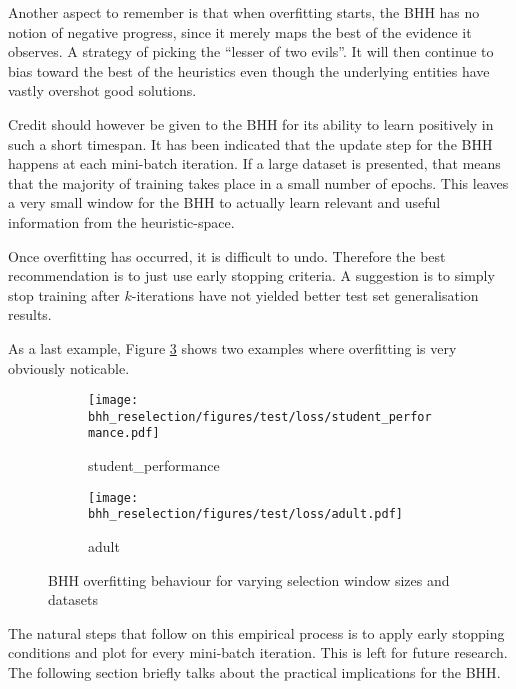 Another aspect to remember is that when overfitting starts, the \Ac{BHH} has no notion of negative progress, since it merely maps the best of the evidence it observes. A strategy of picking the ``lesser of two evils''. It will then continue to bias toward the best of the heuristics even though the underlying entities have vastly overshot good solutions.

Credit should however be given to the \Ac{BHH} for its ability to learn positively in such a short timespan. It has been indicated that the update step for the \Ac{BHH} happens at each mini-batch iteration. If a large dataset is presented, that means that the majority of training takes place in a small number of epochs. This leaves a very small window for the \Ac{BHH} to actually learn relevant and useful information from the heuristic-space.

Once overfitting has occurred, it is difficult to undo. Therefore the best recommendation is to just use early stopping criteria. A suggestion is to simply stop training after $k$-iterations have not yielded better test set generalisation results.

As a last example, Figure \ref{fig:results:overfitting:figures:loss} shows two examples where overfitting is very obviously noticable.

\begin{figure}[htbp]
      \begin{subfigure}{0.5\textwidth}
            \centering
            \texttt{[image: bhh\_reselection/figures/test/loss/student\_performance.pdf]}
            \caption{student\_performance}
            \label{fig:results:overfitting:figures:loss1}
      \end{subfigure}
      \begin{subfigure}{0.5\textwidth}
            \centering
            \texttt{[image: bhh\_reselection/figures/test/loss/adult.pdf]}
            \caption{adult}
            \label{fig:results:overfitting:figures:loss2}
      \end{subfigure}
      \caption{\Acs{BHH} overfitting behaviour for varying selection window sizes and datasets}
      \label{fig:results:overfitting:figures:loss}
\end{figure}

The natural steps that follow on this empirical process is to apply early stopping conditions and plot for every mini-batch iteration. This is left for future research. The following section briefly talks about the practical implications for the \Ac{BHH}.


